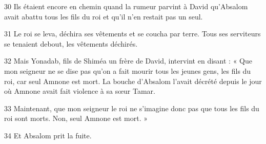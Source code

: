 
30 Ils étaient encore en chemin quand la rumeur parvint à David qu’Absalom avait abattu tous les fils du roi et qu’il n’en restait pas un seul.

31 Le roi se leva, déchira ses vêtements et se coucha par terre. Tous ses serviteurs se tenaient debout, les vêtements déchirés.

32 Mais Yonadab, fils de Shiméa un frère de David, intervint en disant : « Que mon seigneur ne se dise pas qu’on a fait mourir tous les jeunes gens, les fils du roi, car seul Amnone est mort. La bouche d’Absalom l’avait décrété depuis le jour où Amnone avait fait violence à sa sœur Tamar.

33 Maintenant, que mon seigneur le roi ne s’imagine donc pas que tous les fils du roi sont morts. Non, seul Amnone est mort. »

34 Et Absalom prit la fuite.